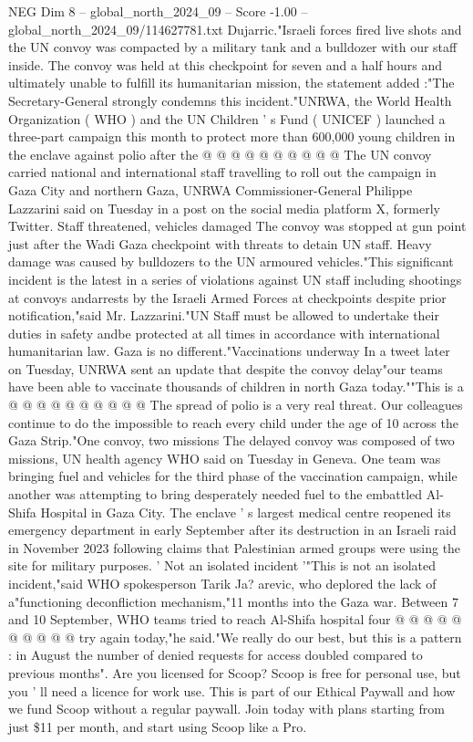 \begin{textsample}{NEG Dim 8 – global\_north\_2024\_09 – Score -1.00 – global\_north\_2024\_09/114627781.txt}
Dujarric."Israeli forces fired live shots and the UN convoy was compacted by a military tank and a bulldozer with our staff inside.
The convoy was held at this checkpoint for seven and a half hours and ultimately unable to fulfill its humanitarian mission, the statement added :"The Secretary-General strongly condemns this incident."UNRWA, the World Health Organization ( WHO ) and the UN Children ' s Fund ( UNICEF ) launched a three-part campaign this month to protect more than 600,000 young children in the enclave against polio after the @ @ @ @ @ @ @ @ @ @ The UN convoy carried national and international staff travelling to roll out the campaign in Gaza City and northern Gaza, UNRWA Commissioner-General Philippe Lazzarini said on Tuesday in a post on the social media platform X, formerly Twitter.
Staff threatened, vehicles damaged The convoy was stopped at gun point just after the Wadi Gaza checkpoint with threats to detain UN staff.
Heavy damage was caused by bulldozers to the UN armoured vehicles."This significant incident is the latest in a series of violations against UN staff including shootings at convoys andarrests by the Israeli Armed Forces at checkpoints despite prior notification,"said Mr.
Lazzarini."UN Staff must be allowed to undertake their duties in safety andbe protected at all times in accordance with international humanitarian law.
Gaza is no different."Vaccinations underway In a tweet later on Tuesday, UNRWA sent an update that despite the convoy delay"our teams have been able to vaccinate thousands of children in north Gaza today.""This is a @ @ @ @ @ @ @ @ @ @ The spread of polio is a very real threat.
Our colleagues continue to do the impossible to reach every child under the age of 10 across the Gaza Strip."One convoy, two missions The delayed convoy was composed of two missions, UN health agency WHO said on Tuesday in Geneva.
One team was bringing fuel and vehicles for the third phase of the vaccination campaign, while another was attempting to bring desperately needed fuel to the embattled Al-Shifa Hospital in Gaza City.
The enclave ' s largest medical centre reopened its emergency department in early September after its destruction in an Israeli raid in November 2023 following claims that Palestinian armed groups were using the site for military purposes. ' Not an isolated incident '"This is not an isolated incident,"said WHO spokesperson Tarik Ja? arevic, who deplored the lack of a"functioning deconfliction mechanism,"11 months into the Gaza war.
Between 7 and 10 September, WHO teams tried to reach Al-Shifa hospital four @ @ @ @ @ @ @ @ @ @ try again today,"he said."We really do our best, but this is a pattern : in August the number of denied requests for access doubled compared to previous months".
Are you licensed for Scoop?
Scoop is free for personal use, but you ' ll need a licence for work use.
This is part of our Ethical Paywall and how we fund Scoop without a regular paywall.
Join today with plans starting from just \$11 per month, and start using Scoop like a Pro.

\end{textsample}
